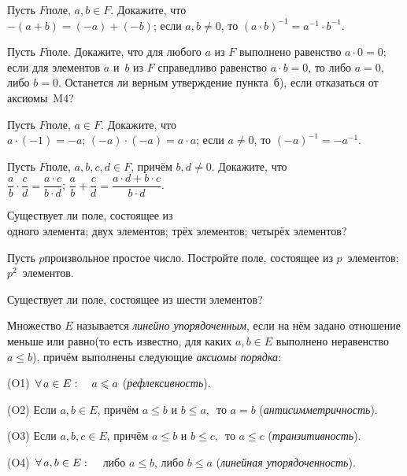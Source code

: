 \documentclass[a4paper,12pt]{article}
\begin{document}
Пусть $F$\т поле, $a,b\in F$. Докажите, что\\
$-(a+b)=(-a)+(-b)$;
если $a,b\ne0$, то $(a\cdot b)^{-1}=a^{-1}\cdot b^{-1}$.

Пусть $F$\т поле. Докажите, что
для любого $a$ из $F$ выполнено равенство $a\cdot 0=0$;
если для элементов $a$ и~$b$ из $F$ справедливо равенство $a\cdot b=0$, то либо $a=0$, либо $b=0$.
Останется ли верным утверждение пункта~б), если отказаться от аксиомы~M4?

Пусть $F$\т поле, $a\in F$. Докажите, что\\
$a\cdot(-1)=-a$;
$(-a)\cdot(-a)=a\cdot a$;
если $a\ne0$, то $(-a)^{-1}=-a^{-1}$.

Пусть $F$\т поле, $a,b,c,d\in F$, причём $b,d\ne0$. Докажите, что\\
\smallskip
{}
$\dfrac a b\cdot\dfrac c d=\dfrac{a\cdot c}{b\cdot d}$;
$\dfrac a b+\dfrac c d=\dfrac{a\cdot d+b\cdot c}{b\cdot d}$.

Существует ли поле, состоящее из\\
одного элемента;
двух элементов;
трёх элементов;
четырёх элементов?

Пусть $p$\т произвольное простое число. Постройте поле, состоящее из
$p$~элементов;
$p^2$~элементов.

Существует ли поле, состоящее из шести элементов?

\newpage


Множество $E$ называется \emph{линейно упорядоченным}, если на нём задано отношение  меньше или равно (то есть известно, для каких $a,b\in E$ выполнено неравенство $a\le b$), причём выполнены следующие \emph{аксиомы порядка}:
\begin{items}{-3}
\item[(O1)]
$\,\forall\, a\in E:\quad a\leqslant a$ (\emph{рефлексивность}).
\item[(O2)]
Если $a,b\in E$, причём $a\le b$ и $b\le a,\,$ то $a=b$ (\emph{антисимметричность}).
\item[(O3)]
Если  $a,b,c\in E$, причём $a\le b$ и $b\le c,\,$ то $a\le c$ (\emph{транзитивность}).
\item[(O4)]
$\,\forall\, a,b\in E:\quad$ либо $a\le b$, либо $b\le a$
(\emph{линейная упорядоченность}).
\end{items}
\vskip -3mm
\end{document}
